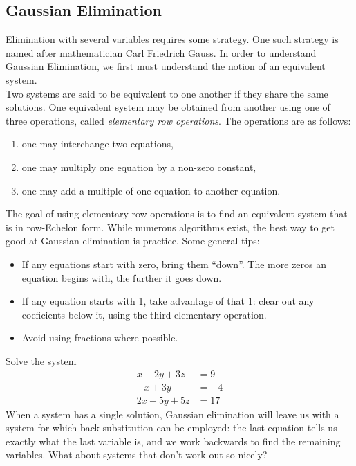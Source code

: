\documentclass[12pt,fleqn]{book}
\begin{document}
\subsection*{Gaussian Elimination}
Elimination with several variables requires some strategy.  One such strategy is named after mathematician Carl Friedrich Gauss.  In order to understand Gaussian Elimination, we first must understand the notion of an equivalent system.
\\[1em]
Two systems are said to be equivalent to one another if they share the same solutions.  One equivalent system may be obtained from another using one of three operations, called \emph{elementary row operations}.  The operations are as follows:
\begin{enumerate}
	\item one may interchange two equations,
	\item one may multiply one equation by a non-zero constant,
	\item one may add a multiple of one equation to another equation.
\end{enumerate}
The goal of using elementary row operations is to find an equivalent system that is in row-Echelon form.  While numerous algorithms exist, the best way to get good at Gaussian elimination is practice.  Some general tips:
\begin{itemize}
	\item If any equations start with zero, bring them ``down''.  The more zeros an equation begins with, the further it goes down.
	\item If any equation starts with 1, take advantage of that 1: clear out any coeficients below it, using the third elementary operation.
	\item Avoid using fractions where possible.
\end{itemize}
Solve the system
\begin{align*}
	x-2y+3z  & =9  \\
	-x+3y    & =-4 \\
	2x-5y+5z & =17
\end{align*}
\vfill
When a system has a single solution, Gaussian elimination will leave us with a system for which back-substitution can be employed: the last equation tells us exactly what the last variable is, and we work backwards to find the remaining variables.  What about systems that don't work out so nicely?
\clearpage
\end{document}

